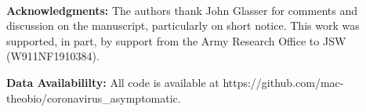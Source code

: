 \mbox{}\\
\noindent
\textbf{Acknowledgments:} The authors thank John Glasser for comments
and discussion on the manuscript, particularly on short notice. 
This work was supported, in part,
by support from the Army Research Office to JSW (W911NF1910384).

\noindent
\textbf{Data Availabililty:} All code is available at https://github.com/mac-theobio/coronavirus\_asymptomatic.
